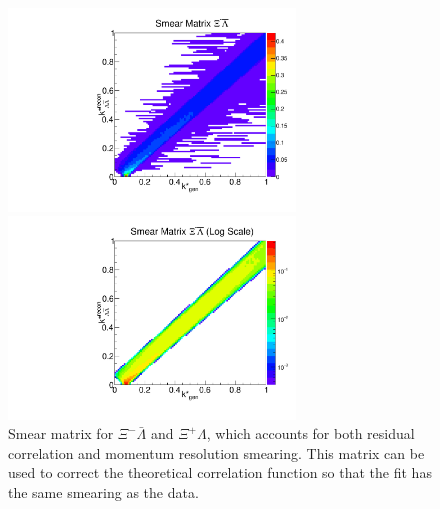 \begin{figure}[h]
\begin{minipage}{18pc}
\includegraphics[width=18pc]{Figures/SmearMatrices/2016-7-19-SmearMatrixXiCLambdaNormLA.pdf}
\end{minipage}\hspace{2pc}
\begin{minipage}{18pc}
\includegraphics[width=18pc]{Figures/SmearMatrices/2016-7-19-SmearMatrixXiCLambdaNormLALog.pdf}
\end{minipage} 
\caption[Smear matrix -- $\Xi^{-}\bar{\Lambda}$ and $\Xi^{+}\Lambda$]{
Smear matrix for $\Xi^{-}\bar{\Lambda}$ and $\Xi^{+}\Lambda$, which accounts for both residual correlation and momentum resolution smearing. This matrix can be used to correct the theoretical correlation function so that the fit has the same smearing as the data.
}
\end{figure}

